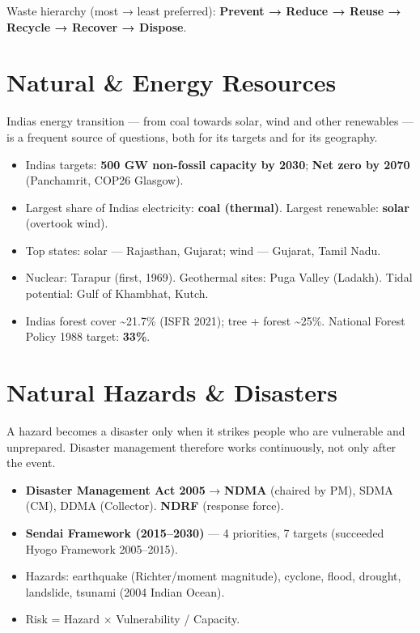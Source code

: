 \endgroup

Waste hierarchy (most → least preferred): \textbf{Prevent → Reduce → Reuse → Recycle → Recover → Dispose}.

\needspace{125pt}

\hypertarget{p1-09--4-natural--energy-resources}{%
\section{Natural \& Energy Resources}\label{p1-09--4-natural--energy-resources}}

India\textquotesingle s energy transition --- from coal towards solar, wind and other renewables --- is a frequent source of
questions, both for its targets and for its geography.



\begin{itemize}
\tightlist
\item
  India\textquotesingle s targets: \textbf{500 GW non-fossil capacity by 2030}; \textbf{Net zero by 2070} (Panchamrit, COP26 Glasgow).
\item
  Largest share of India\textquotesingle s electricity: \textbf{coal (thermal)}. Largest renewable: \textbf{solar} (overtook wind).
\item
  Top states: solar --- Rajasthan, Gujarat; wind --- Gujarat, Tamil Nadu.
\item
  Nuclear: Tarapur (first, 1969). Geothermal sites: Puga Valley (Ladakh). Tidal potential: Gulf of Khambhat, Kutch.
\item
  India\textquotesingle s forest cover \textasciitilde21.7\% (ISFR 2021); tree + forest \textasciitilde25\%. National Forest Policy 1988 target: \textbf{33\%}.
\end{itemize}

\needspace{125pt}

\hypertarget{p1-09--5-natural-hazards--disasters}{%
\section{Natural Hazards \& Disasters}\label{p1-09--5-natural-hazards--disasters}}

A hazard becomes a disaster only when it strikes people who are vulnerable and unprepared. Disaster
management therefore works continuously, not only after the event.



\begin{itemize}
\tightlist
\item
  \textbf{Disaster Management Act 2005} → \textbf{NDMA} (chaired by PM), SDMA (CM), DDMA (Collector). \textbf{NDRF} (response force).
\item
  \textbf{Sendai Framework (2015--2030)} --- 4 priorities, 7 targets (succeeded Hyogo Framework 2005--2015).
\item
  Hazards: earthquake (Richter/moment magnitude), cyclone, flood, drought, landslide, tsunami (2004 Indian Ocean).
\item
  Risk = Hazard × Vulnerability / Capacity.
\end{itemize}

